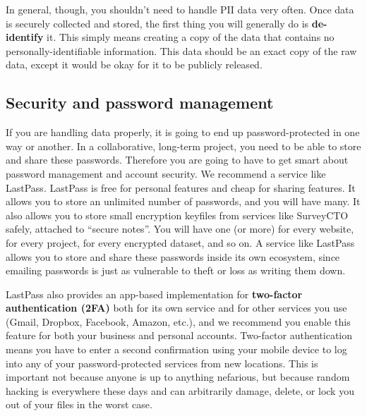 In general, though, you shouldn't need to handle PII data very often.
Once data is securely collected and stored, the first thing you will generally do is \textbf{de-identify} it.
This simply means creating a copy of the data that contains no personally-identifiable information.
This data should be an exact copy of the raw data,
except it would be okay for it to be publicly released.\cite{matthews2011data}

\subsection{Security and password management}

If you are handling data properly, it is going to end up password-protected in one way or another.
In a collaborative, long-term project, you need to be able to store and share these passwords.
Therefore you are going to have to get smart about password management and account security.
We recommend a service like LastPass.
LastPass is free for personal features and cheap for sharing features.
It allows you to store an unlimited number of passwords, and you will have many.
It also allows you to store small encryption keyfiles from services like SurveyCTO safely, attached to ``secure notes''.
You will have one (or more) for every website, for every project, for every encrypted dataset, and so on.
A service like LastPass allows you to store and share these passwords inside its own ecosystem,
since emailing passwords is just as vulnerable to theft or loss as writing them down.

LastPass also provides an app-based implementation for
\textbf{two-factor authentication (2FA)}
both for its own service and for other services you use (Gmail, Dropbox, Facebook, Amazon, etc.),
and we recommend you enable this feature for both your business and personal accounts.
Two-factor authentication means you have to enter a second confirmation using your mobile device
to log into any of your password-protected services from new locations.
This is important not because anyone is up to anything nefarious,
but because random hacking is everywhere these days
and can arbitrarily damage, delete, or lock you out of your files in the worst case.

